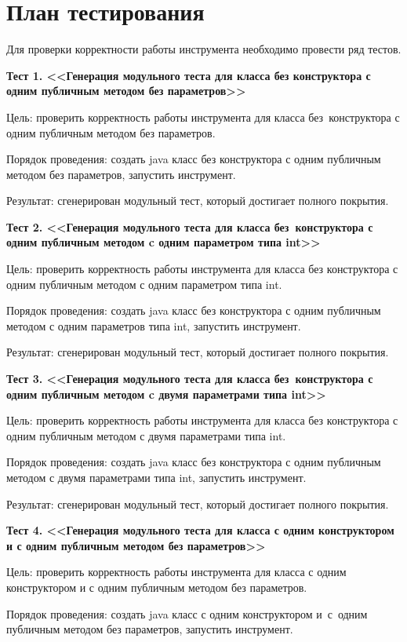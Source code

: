 \section{План тестирования} \label{sub26}

Для проверки корректности работы инструмента необходимо провести ряд тестов.

\textbf{Тест 1. <<Генерация модульного теста для класса без конструктора с одним публичным методом без параметров>>}

Цель: проверить корректность работы инструмента  для класса без~конструктора с одним публичным методом без параметров.

Порядок проведения: создать java класс без конструктора с одним публичным методом без параметров, запустить инструмент.

Результат: сгенерирован модульный тест, который достигает полного покрытия.


\textbf{Тест 2. <<Генерация модульного теста для класса без~конструктора с одним публичным методом c одним параметром типа int>>}

Цель: проверить корректность работы инструмента  для класса без конструктора с одним публичным методом с одним параметром типа int.

Порядок проведения: создать java класс без конструктора с одним публичным методом с одним параметров типа int, запустить инструмент.

Результат: сгенерирован модульный тест, который достигает полного покрытия.


\textbf{Тест 3. <<Генерация модульного теста для класса без~конструктора с одним публичным методом c двумя параметрами типа int>>}

Цель: проверить корректность работы инструмента  для класса без конструктора с одним публичным методом с двумя параметрами типа int.

Порядок проведения: создать java класс без конструктора с одним публичным методом с двумя параметрами типа int, запустить инструмент.

Результат: сгенерирован модульный тест, который достигает полного покрытия.

\textbf{Тест 4. <<Генерация модульного теста для класса с одним конструктором и с одним публичным методом без параметров>>}

Цель: проверить корректность работы инструмента для класса с одним конструктором и с одним публичным методом без параметров.

Порядок проведения: создать java класс с одним конструктором и~с~одним публичным методом без параметров, запустить инструмент.

